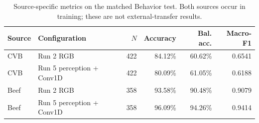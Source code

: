 \begin{table}[htbp]
\centering\small
\caption[Matched Behavior source-specific comparison]{Source-specific metrics on the matched Behavior test. Both sources occur in training; these are not external-transfer results.}
\label{tab:behaviorsourcecomparison}
\begin{tabular}{llrrrr}
\toprule
Source & Configuration & $N$ & Accuracy & Bal. acc. & Macro-F1 \\
\midrule
CVB & Run 2 RGB & 422 & 84.12\% & 60.62\% & 0.6541 \\
CVB & Run 5 perception + Conv1D & 422 & 80.09\% & 61.05\% & 0.6188 \\
Beef & Run 2 RGB & 358 & 93.58\% & 90.48\% & 0.9079 \\
Beef & Run 5 perception + Conv1D & 358 & 96.09\% & 94.26\% & 0.9414 \\
\bottomrule
\end{tabular}
\end{table}
